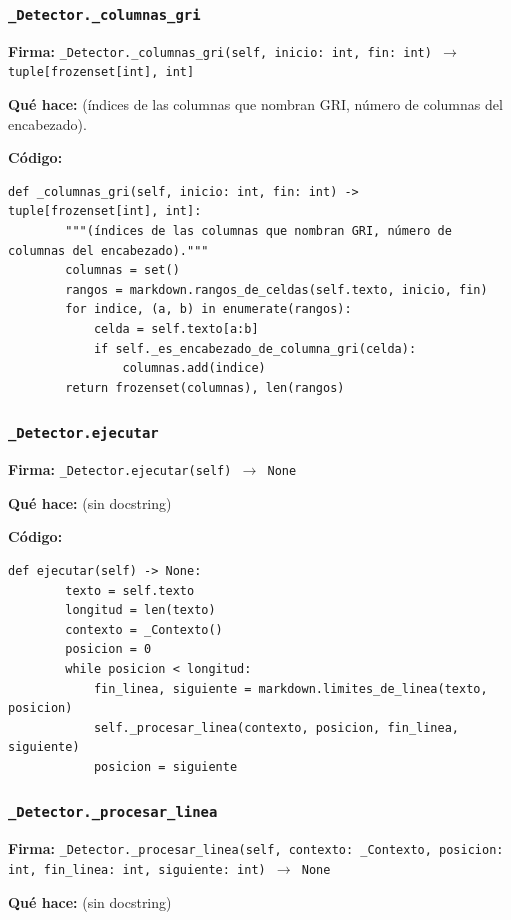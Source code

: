 \documentclass[11pt,a4paper]{article}
\begin{document}
\subsubsection*{\texttt{\_Detector.\_columnas\_gri}}
\textbf{Firma:} \texttt{\_Detector.\_columnas\_gri(self, inicio: int, fin: int) $\rightarrow$ tuple[frozenset[int], int]}

\textbf{Qué hace:} (índices de las columnas que nombran GRI, número de columnas del encabezado).

\textbf{Código:}
\begin{lstlisting}
def _columnas_gri(self, inicio: int, fin: int) -> tuple[frozenset[int], int]:
        """(índices de las columnas que nombran GRI, número de columnas del encabezado)."""
        columnas = set()
        rangos = markdown.rangos_de_celdas(self.texto, inicio, fin)
        for indice, (a, b) in enumerate(rangos):
            celda = self.texto[a:b]
            if self._es_encabezado_de_columna_gri(celda):
                columnas.add(indice)
        return frozenset(columnas), len(rangos)
\end{lstlisting}

\subsubsection*{\texttt{\_Detector.ejecutar}}
\textbf{Firma:} \texttt{\_Detector.ejecutar(self) $\rightarrow$ None}

\textbf{Qué hace:} (sin docstring)

\textbf{Código:}
\begin{lstlisting}
def ejecutar(self) -> None:
        texto = self.texto
        longitud = len(texto)
        contexto = _Contexto()
        posicion = 0
        while posicion < longitud:
            fin_linea, siguiente = markdown.limites_de_linea(texto, posicion)
            self._procesar_linea(contexto, posicion, fin_linea, siguiente)
            posicion = siguiente
\end{lstlisting}

\subsubsection*{\texttt{\_Detector.\_procesar\_linea}}
\textbf{Firma:} \texttt{\_Detector.\_procesar\_linea(self, contexto: \_Contexto, posicion: int, fin\_linea: int, siguiente: int) $\rightarrow$ None}

\textbf{Qué hace:} (sin docstring)
\end{document}
